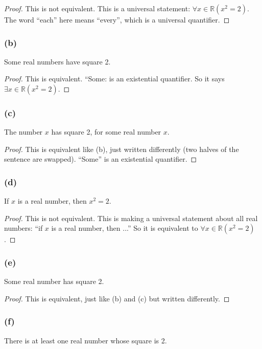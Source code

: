 \documentclass[14pt]{extarticle}
\newcommand{\R}{\mathbb{R}}
\newcommand{\fa}{\forall}
\newcommand{\te}{\exists}
\begin{document}
\begin{proof}
This is not equivalent. This is a universal statement: $\fa x \in \R(x^2 = 2)$. The word ``each'' here means ``every'', which is a universal quantifier.
\end{proof}

\subsubsection{(b)}
Some real numbers have square 2.

\begin{proof}
This is equivalent. ``Some: is an existential quantifier. So it says $\te x \in \R (x^2 = 2)$.
\end{proof}

\subsubsection{(c)}
The number $x$ has square 2, for some real number $x$.

\begin{proof}
This is equivalent like (b), just written differently (two halves of the sentence are swapped). ``Some'' is an existential quantifier.
\end{proof}

\subsubsection{(d)}
If $x$ is a real number, then $x^2 = 2$.

\begin{proof}
This is not equivalent. This is making a universal statement about all real numbers: ``if $x$ is a real number, then ...'' So it is equivalent to $\fa x \in \R (x^2 = 2)$.
\end{proof}

\subsubsection{(e)}
Some real number has square 2.

\begin{proof}
This is equivalent, just like (b) and (c) but written differently.
\end{proof}

\subsubsection{(f)}
There is at least one real number whose square is 2.
\end{document}

